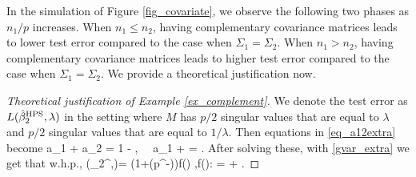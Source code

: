 \iffalse
 
In the simulation of Figure \ref{fig_covariate}, we observe the following two phases as  $n_1 / p$ increases.
When $n_1 \le n_2$, having complementary covariance matrices leads to lower test error compared to the case when $\Sigma_1 = \Sigma_2$.
When $n_1 > n_2$, having complementary covariance matrices leads to higher test error compared to the case when $\Sigma_1 = \Sigma_2$.
We provide a theoretical justification now.

\begin{proof}[Theoretical justification of Example \ref{ex_complement}]
We denote the test error as $L(\hat \beta_{2}^{\textup{HPS}},\lambda)$ in the setting where $M$ has $p/2$ singular values that are equal to $\lambda$ and $p/2$ singular values that are equal to $1 / \lambda$. Then equations in \eqref{eq_a12extra} become
\be\label{compleeq} a_1 + a_2 = 1 - ,  \ \ a_1 + \cdot {} = . \ee
After solving these, with \eqref{gvar_extra} we get that w.h.p.,
\be\label{testcomple}
 \te(\hat \beta_{2}^{\MTL},\lambda)= (1+\OO(p^{-\e}))\cdot f(\lambda) ,\quad f(\lambda): =  + .\ee



\end{proof}
